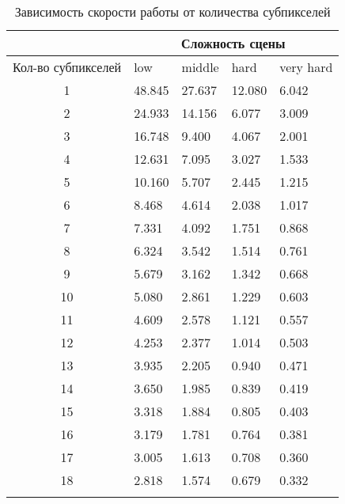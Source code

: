 \begin{center}
\begin{longtable}{|c|p{2cm}|p{2cm}|p{2cm}|p{2cm}|}
\hline & \multicolumn{4}{c|}{Сложность сцены} \\ 
\hline Кол-во субпикселей & low & middle & hard &  very hard\\ 
\hline 1 &  48.845 & 27.637 & 12.080 & 6.042 \\ 
\hline 2 &  24.933 & 14.156 & 6.077 & 3.009 \\ 
\hline 3 &  16.748 & 9.400 & 4.067 & 2.001 \\ 
\hline 4 &  12.631 & 7.095 & 3.027 & 1.533 \\ 
\hline 5 &  10.160 & 5.707 & 2.445 & 1.215 \\ 
\hline 6 &  8.468 & 4.614 & 2.038 & 1.017 \\ 
\hline 7 &  7.331 & 4.092 & 1.751 & 0.868 \\ 
\hline 8 &  6.324 & 3.542 & 1.514 & 0.761 \\ 
\hline 9 &  5.679 & 3.162 & 1.342 & 0.668 \\ 
\hline 10 &  5.080 & 2.861 & 1.229 & 0.603 \\ 
\hline 11 &  4.609 & 2.578 & 1.121 & 0.557 \\ 
\hline 12 &  4.253 & 2.377 & 1.014 & 0.503 \\ 
\hline 13 &  3.935 & 2.205 & 0.940 & 0.471 \\ 
\hline 14 &  3.650 & 1.985 & 0.839 & 0.419 \\ 
\hline 15 &  3.318 & 1.884 & 0.805 & 0.403 \\ 
\hline 16 &  3.179 & 1.781 & 0.764 & 0.381 \\ 
\hline 17 &  3.005 & 1.613 & 0.708 & 0.360 \\ 
\hline 18 &  2.818 & 1.574 & 0.679 & 0.332 \\ 
\hline
\caption{Зависимость скорости работы от количества субпикселей}\label{tab:performance_aa}\end{longtable}
\end{center}


